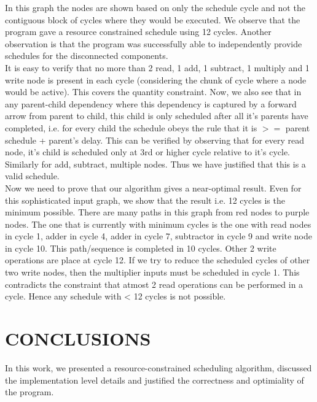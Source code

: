 \documentclass[letterpaper, 10 pt, conference]{ieeeconf}  %
\begin{document}
In this graph the nodes are shown based on only the schedule cycle and not the contiguous block of cycles where they would be executed. We observe that the program gave a resource constrained schedule using 12 cycles. Another observation is that the program was successfully able to independently provide schedules for the disconnected components. \\
It is easy to verify that no more than 2 read, 1 add, 1 subtract, 1 multiply and 1 write node is present in each cycle (considering the chunk of cycle where a node would be active). This covers the quantity constraint. Now, we also see that in any parent-child dependency where this dependency is captured by a forward arrow from parent to child, this child is only scheduled after all it's parents have completed, i.e. for every child the schedule obeys the rule that it is $>=$ parent schedule + parent's delay. This can be verified by observing that for every read node, it's child is scheduled only at 3rd or higher cycle relative to it's cycle. Similarly for add, subtract, multiple nodes. Thus we have justified that this is a valid schedule.\\
Now we need to prove that our algorithm gives a near-optimal result. Even for this sophisticated input graph, we show that the result i.e. 12 cycles is the minimum possible. There are many paths in this graph from red nodes to purple nodes. The one that is currently with minimum cycles is the one with read nodes in cycle 1, adder in cycle 4, adder in cycle 7, subtractor in cycle 9 and write node in cycle 10. This path/sequence is completed in 10 cycles. Other 2 write operations are place at cycle 12. If we try to reduce the scheduled cycles of other two write nodes, then the multiplier inputs must be scheduled in cycle 1. This contradicts the constraint that atmost 2 read operations can be performed in a cycle. Hence any schedule with < 12 cycles is not possible. 

\section{CONCLUSIONS}

In this work, we presented a resource-constrained scheduling algorithm, discussed the implementation level details and justified the correctness and optimiality of the program.


\onecolumn
\end{document}
